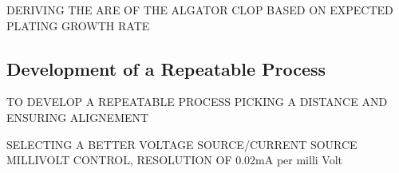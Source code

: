 DERIVING THE ARE OF THE ALGATOR CLOP BASED ON EXPECTED PLATING GROWTH RATE



\subsection{Development of a Repeatable Process}

TO DEVELOP A REPEATABLE PROCESS PICKING A DISTANCE AND ENSURING ALIGNEMENT

SELECTING A BETTER VOLTAGE SOURCE/CURRENT SOURCE MILLIVOLT CONTROL, RESOLUTION OF 0.02mA per milli Volt

